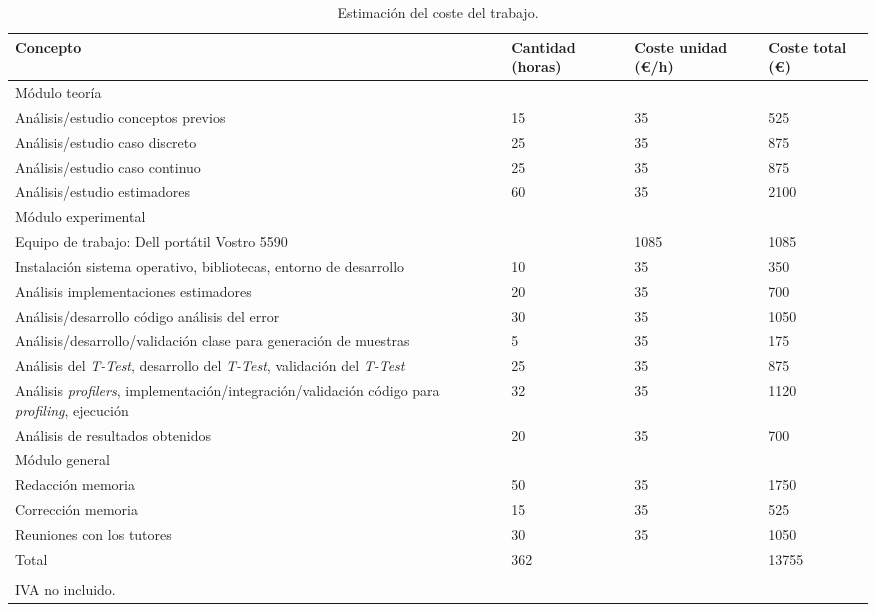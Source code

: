 \documentclass[12pt,a4paper]{report} %
\theoremstyle{definition}
\begin{document}
\begin{table}[hpt]
  
\begin{adjustwidth}{-.4in}{-.4in} 
\centering
\caption{Estimación del coste del trabajo.}
\label{tab:coste}
\begin{tabular}{p{7.3cm}R{2cm}R{2cm}R{2cm}}
  \toprule
Concepto & Cantidad (horas) & Coste unidad (€/h) & Coste total (€)\\
 \midrule
Módulo teoría & & &\\
 \midrule
 Análisis/estudio conceptos previos & 15 & 35 & 525\\[3pt]
 Análisis/estudio caso discreto & 25 & 35 & 875\\[3pt]
 Análisis/estudio caso continuo & 25 & 35 & 875\\[3pt]
 Análisis/estudio estimadores & 60 & 35 & 2100\\[5pt]
 \midrule
 Módulo experimental & & &\\
 \midrule
 Equipo de trabajo: Dell portátil Vostro 5590 & & 1085 & 1085\\[3pt]
 Instalación sistema operativo, bibliotecas, entorno de desarrollo & 10 & 35 & 350\\[3pt]
 Análisis implementaciones estimadores & 20 & 35 & 700\\[3pt]
 Análisis/desarrollo código análisis del error & 30 & 35 & 1050\\[3pt]
 Análisis/desarrollo/validación clase para generación de muestras & 5 & 35 & 175\\[3pt]
 Análisis del \textit{T-Test}, desarrollo del \textit{T-Test}, validación del \textit{T-Test} & 25 & 35 & 875\\[3pt]
 Análisis \textit{profilers}, implementación/integración/validación código para \textit{profiling}, ejecución & 32 & 35 & 1120\\[3pt]
 Análisis de resultados obtenidos & 20 & 35 & 700\\[5pt]
 \midrule
 Módulo general& & &\\
 \midrule
 Redacción memoria & 50 & 35 & 1750\\[3pt]
 Corrección memoria & 15 & 35 & 525\\[3pt]
 Reuniones con los tutores & 30 & 35 & 1050\\[3pt]
 \midrule
 Total & 362 & &13755\\
 \bottomrule\\
 IVA no incluido.&&&\\
\end{tabular}
\end{adjustwidth}
\end{table}
\end{document}
